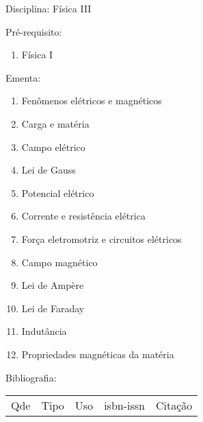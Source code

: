 \documentclass[12pt,a4paper,twoside]{report}
\begin{document}
Disciplina: Física III

Pré-requisito:
\begin{enumerate}
\item Física I
\end{enumerate}

Ementa:
\begin{enumerate}
\item Fenômenos elétricos e magnéticos
\item Carga e matéria
\item Campo elétrico
\item Lei de Gauss
\item Potencial elétrico
\item Corrente e resistência elétrica
\item Força eletromotriz e circuitos elétricos
\item Campo magnético
\item Lei de Ampère
\item Lei de Faraday
\item Indutância
\item Propriedades magnéticas da matéria
\end{enumerate}

Bibliografia:
\begin{tabular}{lllll}
Qde & Tipo & Uso & isbn-issn & Citação \\
\end{tabular}
\end{document}

